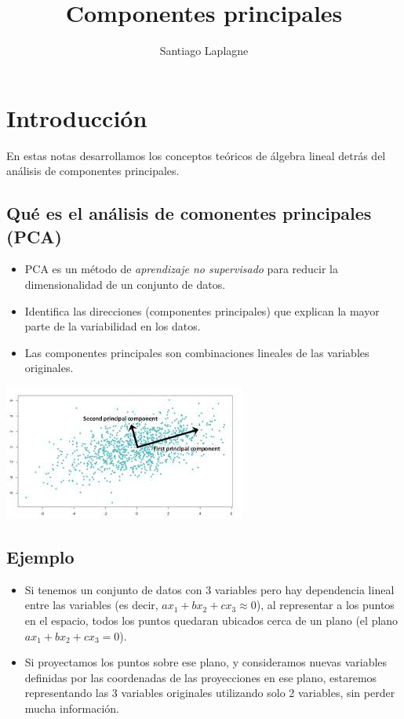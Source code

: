 \documentclass[a4paper]{article}
\title{Componentes principales}
\author{Santiago Laplagne}
\begin{document}
\maketitle

\section{Introducci\'on}

En estas notas desarrollamos los conceptos teóricos de álgebra lineal detrás del análisis de componentes principales.

\subsection{Qué es el análisis de comonentes principales (PCA)}

\begin{itemize}
    \item PCA es un método de \emph{aprendizaje no supervisado} para reducir la dimensionalidad de un conjunto de datos.
    \item Identifica las direcciones (componentes principales) que explican la mayor parte de la variabilidad en los datos.
    \item Las componentes principales son combinaciones lineales de las variables originales.
\end{itemize}

\begin{center}
\includegraphics[scale=0.5]{dosComponentes.jpg}
\end{center}

\subsection{Ejemplo}

\begin{itemize}
\item Si tenemos un conjunto de datos con 3 variables pero hay dependencia lineal entre las variables (es decir, $a x_1 + b x_2 + c x_3 \approx 0$), al representar a los puntos en el espacio, todos los puntos quedaran ubicados cerca de un plano (el plano $a x_1 + b x_2 + c x_3 = 0$).
\item Si proyectamos los puntos sobre ese plano, y consideramos nuevas variables definidas por las coordenadas de las proyecciones en ese plano, estaremos representando las 3 variables originales utilizando solo 2 variables, sin perder mucha información.
\end{itemize}
\end{document}
